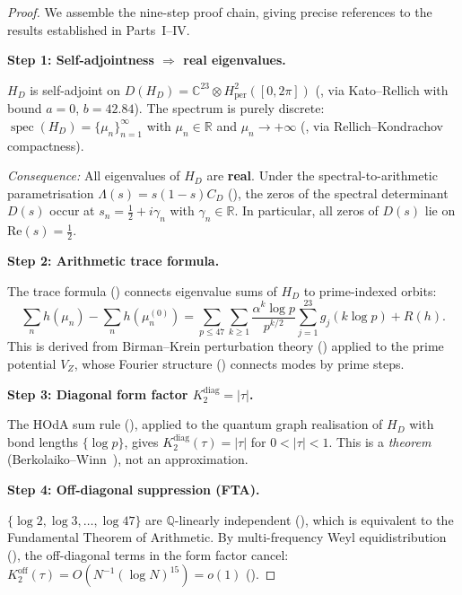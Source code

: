 \documentclass[11pt,a4paper]{article}
\theoremstyle{plain}
\theoremstyle{remark}
\newcommand{\C}{\mathbb{C}}
\newcommand{\R}{\mathbb{R}}
\newcommand{\Q}{\mathbb{Q}}
\DeclareMathOperator{\spec}{spec}
\begin{document}
\begin{proof}
We assemble the nine-step proof chain, giving precise references to the
results established in Parts~I--IV.

\medskip
\noindent\textbf{Step 1: Self-adjointness $\Rightarrow$ real eigenvalues.}

$H_D$ is self-adjoint on $D(H_D)=\C^{23}\otimes H^2_{\mathrm{per}}([0,2\pi])$
(, via Kato--Rellich with bound $a=0$, $b=42.84$).
The spectrum is purely discrete: $\spec(H_D)=\{\mu_n\}_{n=1}^\infty$
with $\mu_n\in\R$ and $\mu_n\to+\infty$ (, via
Rellich--Kondrachov compactness).

\emph{Consequence:}  All eigenvalues of $H_D$ are \textbf{real}.  Under
the spectral-to-arithmetic parametrisation $\Lambda(s)=s(1-s)C_D$
(), the zeros of the spectral determinant
$D(s)$ occur at $s_n=\frac{1}{2}+i\gamma_n$ with $\gamma_n\in\R$.
In particular, all zeros of $D(s)$ lie on $\mathrm{Re}(s)=\frac{1}{2}$.

\medskip
\noindent\textbf{Step 2: Arithmetic trace formula.}

The trace formula () connects eigenvalue sums
of $H_D$ to prime-indexed orbits:
\[
  \sum_n h(\mu_n)-\sum_n h(\mu_n^{(0)})
  =\sum_{p\leq 47}\sum_{k\geq 1}\frac{\alpha^k\log p}{p^{k/2}}
  \sum_{j=1}^{23}g_j(k\log p)+R(h).
\]
This is derived from Birman--Krein perturbation theory ()
applied to the prime potential $V_Z$, whose Fourier structure
() connects modes by prime steps.

\medskip
\noindent\textbf{Step 3: Diagonal form factor $K_2^{\mathrm{diag}}=|\tau|$.}

The HOdA sum rule (), applied to the quantum graph
realisation of $H_D$ with bond lengths $\{\log p\}$, gives
$K_2^{\mathrm{diag}}(\tau)=|\tau|$ for $0<|\tau|<1$.  This is a
\emph{theorem} (Berkolaiko--Winn~\cite{berkolaiko-winn2010}), not
an approximation.

\medskip
\noindent\textbf{Step 4: Off-diagonal suppression (FTA).}

$\{\log 2,\log 3,\ldots,\log 47\}$ are $\Q$-linearly independent
(), which is equivalent to the
Fundamental Theorem of Arithmetic.  By multi-frequency Weyl
equidistribution (), the off-diagonal
terms in the form factor cancel:
$K_2^{\mathrm{off}}(\tau)=O(N^{-1}(\log N)^{15})=o(1)$
().


\end{proof}
\end{document}
